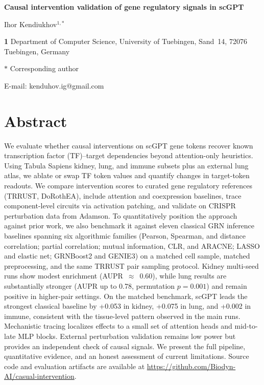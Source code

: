 \documentclass[10pt,letterpaper]{article}
\begin{document}

\begin{flushleft}
{\Large\bfseries Causal intervention validation of gene regulatory signals in scGPT}
\bigskip

Ihor Kendiukhov$^{1,*}$

\bigskip

\textbf{1} Department of Computer Science, University of Tuebingen, Sand~14,
72076 Tuebingen, Germany

\bigskip

$*$ Corresponding author

E-mail: kenduhov.ig@gmail.com

\end{flushleft}

\newpage


\section*{Abstract}

We evaluate whether causal interventions on scGPT gene tokens recover known
transcription factor (TF)--target dependencies beyond attention-only heuristics.
Using Tabula Sapiens kidney, lung, and immune subsets plus an external lung
atlas, we ablate or swap TF token values and quantify changes in target-token
readouts. We compare intervention scores to curated gene regulatory references
(TRRUST, DoRothEA), include attention and coexpression baselines, trace
component-level circuits via activation patching, and validate on CRISPR
perturbation data from Adamson. To quantitatively position the approach
against prior work, we also benchmark it against eleven classical GRN
inference baselines spanning six algorithmic families (Pearson, Spearman,
and distance correlation; partial correlation; mutual information, CLR,
and ARACNE; LASSO and elastic net; GRNBoost2 and GENIE3) on a matched
cell sample, matched preprocessing, and the same TRRUST pair sampling
protocol.
Kidney multi-seed runs show modest enrichment (AUPR~$\approx$~0.60), while
lung results are substantially stronger (AUPR up to 0.78, permutation
$p{=}0.001$) and remain positive in higher-pair settings. On the matched
benchmark, scGPT leads the strongest classical baseline by +0.053 in
kidney, +0.075 in lung, and +0.002 in immune, consistent with the
tissue-level pattern observed in the main runs. Mechanistic tracing
localizes effects to a small set of attention heads and mid-to-late MLP
blocks. External perturbation validation remains low power but provides
an independent check of causal signals. We present the full pipeline,
quantitative evidence, and an honest assessment of current limitations.
Source code and evaluation artifacts are available at
\url{https://github.com/Biodyn-AI/casual-intervention}.
\end{document}
